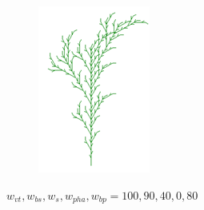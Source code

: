 \begin{figure}[H]
\begin{subfigure}[b]{0.1\textwidth}
        \includegraphics[width=\textwidth]{tree_block2.png}
    \end{subfigure}

    \vspace{0.5cm}
    \caption{$w_{vt}, w_{bs}, w_{s}, w_{pha}, w_{bp} = 100, 90, 40, 0, 80$}
    \label{fig:mutation_comparison}
\end{figure}

